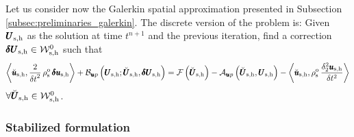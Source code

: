 \documentclass[11pt,english]{article}
\def\usolidh{\pmb{u}_{\rm{s},\rm{h}}}                    %
\def\unknosolidh{\pmb{U}_{\rm{s},\rm{h}}}                %
\def\testusolidh{\breve{\pmb{u}}_{\rm{s},\rm{h}}}       %
\def\testsolidh{\breve{\pmb{U}}_{\rm{s},\rm{h}}}        %
\def\usolidinch{\pmb{\delta u}_{\rm{s},\rm{h}}}           %
\def\unknosolidinch{\pmb{\delta U}_{\rm{s},\rm{h}}}       %
\def\testsolidspaceh{\mathcal{W}_{\rm{s},\rm{h}}^{0}}     %
\def\denssolid{\rho_{\rm{s}}^{\rm{o}}}  %
\def\up{\pmb{u} p}
\def\dt{{\delta t}}                                     %
\def\BDFduhdt2{\frac{\delta_2^2 \usolidh}{\delta t^2}}    %
\begin{document}
Let us consider now the Galerkin spatial approximation presented in Subsection \ref{subsec:preliminaries_galerkin}. The discrete version of the problem is: Given $\unknosolidh$ as the solution at time $t^{n+1}$ and  the previous iteration, find a correction $\unknosolidinch \in \testsolidspaceh$ such that
\begin{equation*}
    \left \langle \testusolidh , \frac{2}{\dt^2}\, \denssolid \, \usolidinch \right \rangle + \mathcal{B}_{\up} \left ( \unknosolidh; \testsolidh, \unknosolidinch \right) = \mathcal{F} \left ( \testsolidh  \right) -  \mathcal{A}_{\up} \left ( \testsolidh , \unknosolidh \right) - \left \langle \testusolidh, \denssolid \, \BDFduhdt2 \right \rangle
\end{equation*}
$\forall \testsolidh \in \testsolidspaceh$.
\subsubsection{Stabilized formulation\label{subsubsec:up_stabilization}}
\end{document}
